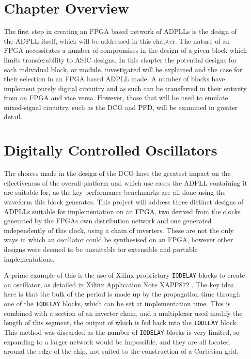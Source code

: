 \section{Chapter Overview}
The first step in creating an \ac{FPGA} based network of \ac{ADPLL}s is the design of the \ac{ADPLL} itself, which will be addressed in this chapter. The nature of an \ac{FPGA} necessitates a number of compromises in the design of a given block which limits transferability to \ac{ASIC} designs. In this chapter the potential designs for each individual block, or module, investigated will be explained and the case for their selection in an \ac{FPGA} based \ac{ADPLL} made. A number of blocks have implement purely digital circuitry and as such can be transferred in their entirety from an \ac{FPGA} and vice versa. However, those that will be used to emulate mixed-signal circuitry, such as the \ac{DCO} and \ac{PFD}, will be examined in greater detail.

\section{Digitally Controlled Oscillators}
The choices made in the design of the \ac{DCO} have the greatest impact on the effectiveness of the overall platform and which use cases the \ac{ADPLL} containing it are suitable for, as the key performance benchmarks are all done using the waveform this block generates. This project will address three distinct designs of \ac{ADPLL}s suitable for implementation on an FPGA, two derived from the clocks generated by the \ac{FPGA}s own distribution network and one generated independently of this clock, using a chain of inverters. These are not the only ways in which an oscillator could be synthesised on an \ac{FPGA}, however other designs were deemed to be unsuitable for extensible and portable implementations.

A prime example of this is the use of Xilinx proprietary \texttt{IODELAY} blocks to create an oscillator, as detailed in Xilinx Application Note XAPP872 \cite{iodelay}. The key idea here is that the bulk of the period is made up by the propagation time through one of the \texttt{IODELAY} blocks, which can be set at implementation time. This is combined with a section of an inverter chain, and a multiplexer used modify the length of this segment, the output of which is fed back into the \texttt{IODELAY} block. This method was discarded as the number of \texttt{IODELAY} blocks is very limited, so expanding to a larger network would be impossible, and they are all located around the edge of the chip, not suited to the construction of a Cartesian grid.

